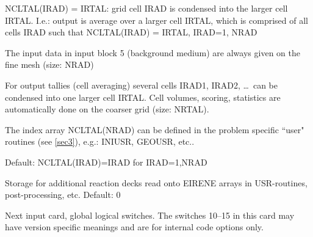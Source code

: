 \begin{description}
        NCLTAL(IRAD) = IRTAL: grid cell IRAD is condensed into the larger cell IRTAL.
        I.e.: output is average over a larger cell IRTAL, which is comprised of all
        cells IRAD such that NCLTAL(IRAD) = IRTAL,  IRAD=1, NRAD 

        The input data in input block 5 (background medium) are always given on the
        fine mesh (size: NRAD) 

        For output tallies (cell averaging) several cells IRAD1, IRAD2, \dots\ can be
        condensed into one larger cell IRTAL.
        Cell volumes, scoring, statistics are automatically done on the coarser grid
        (size: NRTAL).

        The index array NCLTAL(NRAD) can be defined in the problem specific ``user"
        routines (see \cref{sec3}), e.g.: INIUSR, GEOUSR, etc..

        Default: NCLTAL(IRAD)=IRAD for IRAD=1,NRAD
  \item[NREAC\_ADD] Storage for
        additional reaction decks read onto EIRENE arrays in USR-rou\-tines,
        post-processing, etc. Default: 0
\end{description}
Next input card, global
logical switches.
The switches 10--15 in this card may have version specific meanings and are for
internal code options only.
